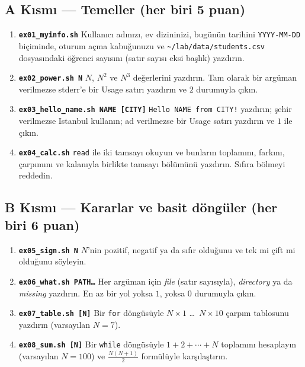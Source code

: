\subsection*{A Kısmı --- Temeller (her biri 5 puan)}
\begin{enumerate}[leftmargin=1.6em]
  \item \textbf{\texttt{ex01\_myinfo.sh}} Kullanıcı adınızı, ev dizininizi, bugünün tarihini \texttt{YYYY-MM-DD} biçiminde, oturum açma kabuğunuzu ve \texttt{\textasciitilde/lab/data/students.csv} dosyasındaki öğrenci sayısını (satır sayısı eksi başlık) yazdırın.
  \item \textbf{\texttt{ex02\_power.sh N}} $N$, $N^2$ ve $N^3$ değerlerini yazdırın. Tam olarak bir argüman verilmezse stderr'e bir Usage satırı yazdırın ve $2$ durumuyla çıkın.
  \item \textbf{\texttt{ex03\_hello\_name.sh NAME [CITY]}} \texttt{Hello NAME from CITY!} yazdırın; şehir verilmezse Istanbul kullanın; ad verilmezse bir Usage satırı yazdırın ve $1$ ile çıkın.
  \item \textbf{\texttt{ex04\_calc.sh}} \texttt{read} ile iki tamsayı okuyun ve bunların toplamını, farkını, çarpımını ve kalanıyla birlikte tamsayı bölümünü yazdırın. Sıfıra bölmeyi reddedin.
\end{enumerate}

\subsection*{B Kısmı --- Kararlar ve basit döngüler (her biri 6 puan)}
\begin{enumerate}[leftmargin=1.6em,resume]
  \item \textbf{\texttt{ex05\_sign.sh N}} $N$'nin pozitif, negatif ya da sıfır olduğunu ve tek mi çift mi olduğunu söyleyin.
  \item \textbf{\texttt{ex06\_what.sh PATH\ldots}} Her argüman için \emph{file} (satır sayısıyla), \emph{directory} ya da \emph{missing} yazdırın. En az bir yol yoksa $1$, yoksa $0$ durumuyla çıkın.
  \item \textbf{\texttt{ex07\_table.sh [N]}} Bir \texttt{for} döngüsüyle $N \times 1$ \ldots\ $N \times 10$ çarpım tablosunu yazdırın (varsayılan $N = 7$).
  \item \textbf{\texttt{ex08\_sum.sh [N]}} Bir \texttt{while} döngüsüyle $1 + 2 + \cdots + N$ toplamını hesaplayın (varsayılan $N = 100$) ve $\frac{N(N+1)}{2}$ formülüyle karşılaştırın.
\end{enumerate}

